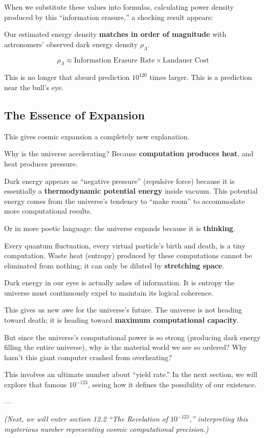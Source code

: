 When we substitute these values into formulas, calculating power density produced by this ``information erasure,'' a shocking result appears:

Our estimated energy density \textbf{matches in order of magnitude} with astronomers' observed dark energy density $\rho_{\Lambda}$.

$$\rho_{\Lambda} \approx \text{Information Erasure Rate} \times \text{Landauer Cost}$$

This is no longer that absurd prediction $10^{120}$ times larger. This is a prediction near the bull's eye.

\subsection{The Essence of Expansion}

This gives cosmic expansion a completely new explanation.

Why is the universe accelerating? Because \textbf{computation produces heat}, and heat produces pressure.

Dark energy appears as ``negative pressure'' (repulsive force) because it is essentially a \textbf{thermodynamic potential energy} inside vacuum. This potential energy comes from the universe's tendency to ``make room'' to accommodate more computational results.

Or in more poetic language: the universe expands because it is \textbf{thinking}.

Every quantum fluctuation, every virtual particle's birth and death, is a tiny computation. Waste heat (entropy) produced by these computations cannot be eliminated from nothing; it can only be diluted by \textbf{stretching space}.

Dark energy in our eyes is actually ashes of information. It is entropy the universe must continuously expel to maintain its logical coherence.

This gives us new awe for the universe's future. The universe is not heading toward death; it is heading toward \textbf{maximum computational capacity}.

But since the universe's computational power is so strong (producing dark energy filling the entire universe), why is the material world we see so ordered? Why hasn't this giant computer crashed from overheating?

This involves an ultimate number about ``yield rate.'' In the next section, we will explore that famous $10^{-123}$, seeing how it defines the possibility of our existence.

---

\textit{(Next, we will enter section 12.2 ``The Revelation of $10^{-123}$,'' interpreting this mysterious number representing cosmic computational precision.)}

